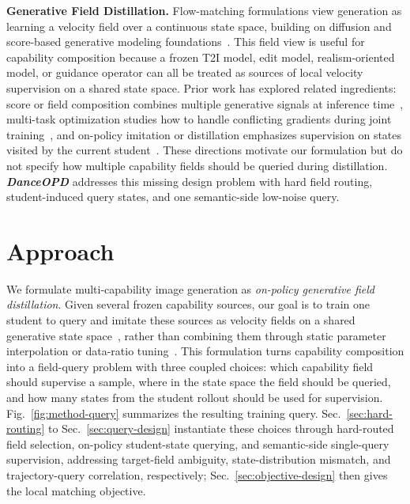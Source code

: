 \documentclass{llmxive}
\providecommand{\name}{\textsl{\textbf{DanceOPD}}\xspace}
\begin{document}
\noindent\textbf{Generative Field Distillation.}
Flow-matching formulations view generation as learning a velocity field over a continuous state space, building on diffusion and score-based generative modeling foundations~\cite{ho2020denoising,lipman2022flow,liu2022flow,albergo2025stochastic,tong2023improving,dao2023flow}. This field view is useful for capability composition because a frozen T2I model, edit model, realism-oriented model, or guidance operator can all be treated as sources of local velocity supervision on a shared state space. Prior work has explored related ingredients: score or field composition combines multiple generative signals at inference time~\cite{du2023reduce,bar2023multidiffusion}, multi-task optimization studies how to handle conflicting gradients during joint training~\cite{chen2018gradnorm,sener2018multi,yu2020gradient,liu2021conflict,javaloy2021rotograd}, and on-policy imitation or distillation emphasizes supervision on states visited by the current student~\cite{ross2011reduction,li2026diffusionopd,fang2026flow}. These directions motivate our formulation but do not specify how multiple capability fields should be queried during distillation. \name{} addresses this missing design problem with hard field routing, student-induced query states, and one semantic-side low-noise query.

\section{Approach}
\label{sec:approach}

We formulate multi-capability image generation as \emph{on-policy generative field distillation}. Given several frozen capability sources, our goal is to train one student to query and imitate these sources as velocity fields on a shared generative state space~\cite{lipman2022flow,liu2022flow,albergo2025stochastic}, rather than combining them through static parameter interpolation or data-ratio tuning~\cite{ilharco2022editing,wortsman2022model,yadav2023ties}. This formulation turns capability composition into a field-query problem with three coupled choices: which capability field should supervise a sample, where in the state space the field should be queried, and how many states from the student rollout should be used for supervision. Fig.~\ref{fig:method-query} summarizes the resulting training query. Sec.~\ref{sec:hard-routing} to Sec.~\ref{sec:query-design} instantiate these choices through hard-routed field selection, on-policy student-state querying, and semantic-side single-query supervision, addressing target-field ambiguity, state-distribution mismatch, and trajectory-query correlation, respectively; Sec.~\ref{sec:objective-design} then gives the local matching objective.
\end{document}
